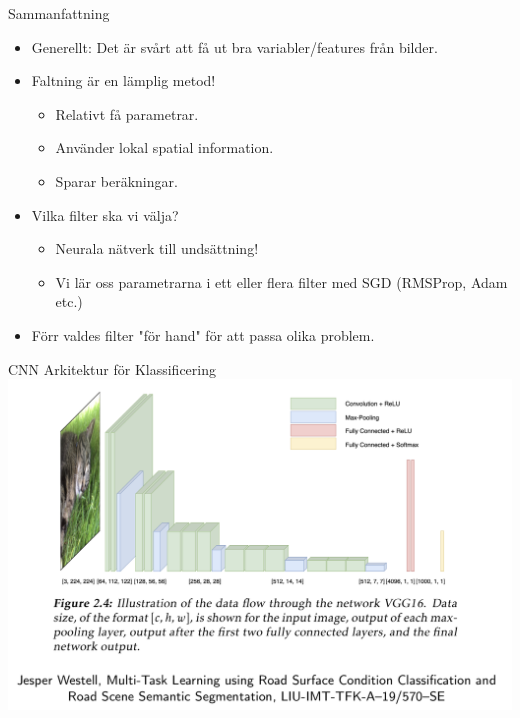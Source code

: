 \documentclass[10pt,english]{beamer}
\begin{document}
\begin{frame}{Sammanfattning}

    \begin{itemize}
        \item Generellt: Det är svårt att få ut bra variabler/features från bilder.
        \item Faltning är en lämplig metod!
        \begin{itemize}
            \item Relativt få parametrar.
            \item Använder lokal spatial information.
            \item Sparar beräkningar.
        \end{itemize}
        \item Vilka filter ska vi välja?
        \begin{itemize}
            \item Neurala nätverk till undsättning!
            \item Vi lär oss parametrarna i ett eller flera filter med SGD (RMSProp, Adam etc.)
        \end{itemize}
        \item Förr valdes filter "för hand" för att passa olika problem.
    \end{itemize}
    
\end{frame}

\begin{frame}{CNN Arkitektur för Klassificering}
    \includegraphics[width = \textwidth]{figs/CNN ARCHITECTURE.png}
\end{frame}
\end{document}
